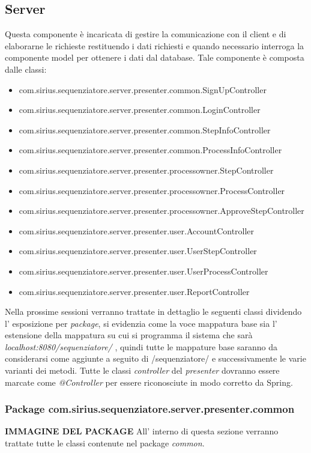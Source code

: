 \subsection{Server}
Questa componente è incaricata di gestire la comunicazione con il client e di elaborarne le richieste restituendo i dati richiesti e quando necessario interroga la componente model per ottenere i dati dal database.
Tale componente è composta dalle classi:
\begin{itemize}
	\item com.sirius.sequenziatore.server.presenter.common.SignUpController
	\item com.sirius.sequenziatore.server.presenter.common.LoginController
	\item com.sirius.sequenziatore.server.presenter.common.StepInfoController
	\item com.sirius.sequenziatore.server.presenter.common.ProcessInfoController
	\item com.sirius.sequenziatore.server.presenter.processowner.StepController
	\item com.sirius.sequenziatore.server.presenter.processowner.ProcessController
	\item com.sirius.sequenziatore.server.presenter.processowner.ApproveStepController
	\item com.sirius.sequenziatore.server.presenter.user.AccountController
	\item com.sirius.sequenziatore.server.presenter.user.UserStepController
	\item com.sirius.sequenziatore.server.presenter.user.UserProcessController
	\item com.sirius.sequenziatore.server.presenter.user.ReportController
\end{itemize}
Nella prossime sessioni verranno trattate in dettaglio le seguenti classi dividendo l' esposizione per \textit{package}, si evidenzia come la voce mappatura base sia l' estensione della mappatura su cui si programma il sistema che sarà \textit{localhost:8080/sequenziatore/} , quindi tutte le mappature base saranno da considerarsi come aggiunte a seguito di /sequenziatore/ e successivamente le varie varianti dei metodi.
Tutte le classi \textit{controller} del \textit{presenter} dovranno essere marcate come \textit{@Controller} per essere riconosciute in modo corretto da Spring.
\subsubsection{Package com.sirius.sequenziatore.server.presenter.common}
\textbf{IMMAGINE DEL PACKAGE}
All' interno di questa sezione verranno trattate tutte le classi contenute nel package \textit{common}.

